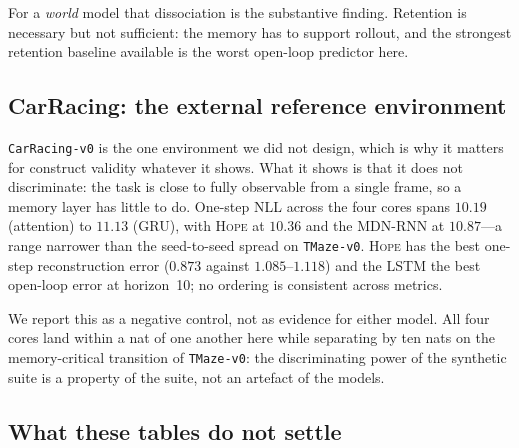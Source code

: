 \documentclass[11pt,a4paper]{article}
\newcommand{\code}[1]{\texttt{\small #1}}
\begin{document}
For a \emph{world} model that dissociation is the substantive finding. Retention
is necessary but not sufficient: the memory has to support rollout, and the
strongest retention baseline available is the worst open-loop predictor here.

\subsection{CarRacing: the external reference environment}

\code{CarRacing-v0} is the one environment we did not design, which is why it
matters for construct validity whatever it shows. What it shows is that it does
not discriminate: the task is close to fully observable from a single frame, so a
memory layer has little to do. One-step NLL across the four cores spans $10.19$
(attention) to $11.13$ (GRU), with \textsc{Hope} at $10.36$ and the MDN-RNN at
$10.87$---a range narrower than the seed-to-seed spread on \code{TMaze-v0}.
\textsc{Hope} has the best one-step reconstruction error ($0.873$ against
$1.085$--$1.118$) and the LSTM the best open-loop error at horizon~10; no
ordering is consistent across metrics.

We report this as a negative control, not as evidence for either model. All four
cores land within a nat of one another here while separating by ten nats on the
memory-critical transition of \code{TMaze-v0}: the discriminating power of the
synthetic suite is a property of the suite, not an artefact of the models.

\subsection{What these tables do not settle}
\end{document}
